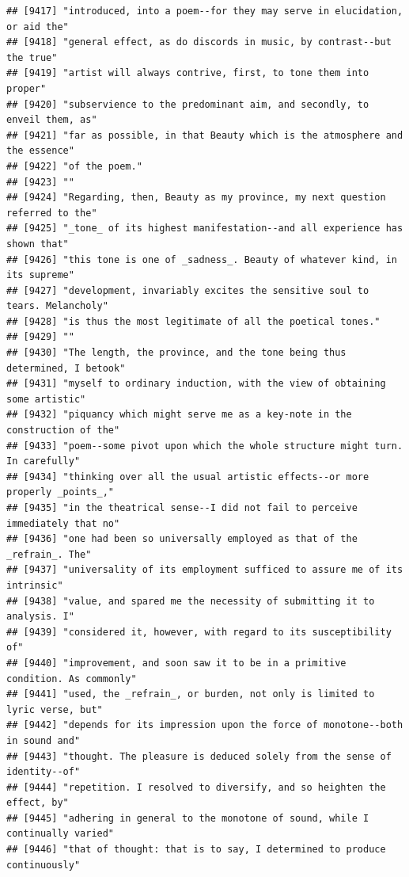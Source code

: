 \documentclass{article}\usepackage[]{graphicx}\usepackage[]{color}
\makeatletter
\newenvironment{kframe}{%
 \def\at@end@of@kframe{}%
 \ifinner\ifhmode%
  \def\at@end@of@kframe{\end{minipage}}%
  \begin{minipage}{\columnwidth}%
 \fi\fi%
 \def\FrameCommand##1{\hskip\@totalleftmargin \hskip-\fboxsep
 \colorbox{shadecolor}{##1}\hskip-\fboxsep
     \hskip-\linewidth \hskip-\@totalleftmargin \hskip\columnwidth}%
 \MakeFramed {\advance\hsize-\width
   \@totalleftmargin\z@ \linewidth\hsize
   \@setminipage}}%
 {\par\unskip\endMakeFramed%
 \at@end@of@kframe}
\newenvironment{knitrout}{}{} %
\makeatother
\begin{document}
\begin{knitrout}
\begin{kframe}
\begin{verbatim}
## [9417] "introduced, into a poem--for they may serve in elucidation, or aid the"      
## [9418] "general effect, as do discords in music, by contrast--but the true"          
## [9419] "artist will always contrive, first, to tone them into proper"                
## [9420] "subservience to the predominant aim, and secondly, to enveil them, as"       
## [9421] "far as possible, in that Beauty which is the atmosphere and the essence"     
## [9422] "of the poem."                                                                
## [9423] ""                                                                            
## [9424] "Regarding, then, Beauty as my province, my next question referred to the"    
## [9425] "_tone_ of its highest manifestation--and all experience has shown that"      
## [9426] "this tone is one of _sadness_. Beauty of whatever kind, in its supreme"      
## [9427] "development, invariably excites the sensitive soul to tears. Melancholy"     
## [9428] "is thus the most legitimate of all the poetical tones."                      
## [9429] ""                                                                            
## [9430] "The length, the province, and the tone being thus determined, I betook"      
## [9431] "myself to ordinary induction, with the view of obtaining some artistic"      
## [9432] "piquancy which might serve me as a key-note in the construction of the"      
## [9433] "poem--some pivot upon which the whole structure might turn. In carefully"    
## [9434] "thinking over all the usual artistic effects--or more properly _points_,"    
## [9435] "in the theatrical sense--I did not fail to perceive immediately that no"     
## [9436] "one had been so universally employed as that of the _refrain_. The"          
## [9437] "universality of its employment sufficed to assure me of its intrinsic"       
## [9438] "value, and spared me the necessity of submitting it to analysis. I"          
## [9439] "considered it, however, with regard to its susceptibility of"                
## [9440] "improvement, and soon saw it to be in a primitive condition. As commonly"    
## [9441] "used, the _refrain_, or burden, not only is limited to lyric verse, but"     
## [9442] "depends for its impression upon the force of monotone--both in sound and"    
## [9443] "thought. The pleasure is deduced solely from the sense of identity--of"      
## [9444] "repetition. I resolved to diversify, and so heighten the effect, by"         
## [9445] "adhering in general to the monotone of sound, while I continually varied"    
## [9446] "that of thought: that is to say, I determined to produce continuously"       

\end{verbatim}
\end{kframe}
\end{knitrout}
\end{document}

